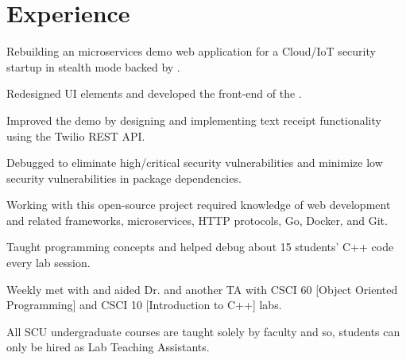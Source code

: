 \documentclass[]{deedy-resume-openfont}
\begin{document}
\begin{minipage}[t]{0.66\textwidth} 



\section{Experience}

\vspace{\topsep} %
\begin{tightemize}\item Rebuilding an \href{https://microservices-demo.github.io/}{} microservices demo web application for a Cloud/IoT security startup in stealth mode backed by \href{http://www.thefabricnet.com/}{}.
\item Redesigned UI elements and developed the front-end of the \href{https://github.com/tanya-sonker/KupcakeShop}{}. 
\item Improved the demo by designing and implementing text receipt functionality using the Twilio REST API.
\item Debugged to eliminate high/critical security vulnerabilities and minimize low  security vulnerabilities in package dependencies.
\item Working with this open-source project required knowledge of web development and related frameworks, microservices, HTTP protocols, Go, Docker, and Git.
\end{tightemize}
\sectionsep

\begin{tightemize}\item Taught programming concepts and helped debug about 15 students' C++ code every lab session. \item Weekly met with and aided Dr.  \href{https://math.scu.edu/~linnell/}{} and another TA with CSCI 60 [Object Oriented Programming] and CSCI 10 [Introduction to C++] labs.
\item All SCU undergraduate courses are taught solely by faculty and so, students can only be hired as Lab Teaching Assistants.
\end{tightemize}
\sectionsep


\end{minipage}
\end{document}
